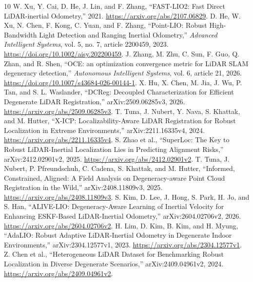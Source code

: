 \documentclass[conference]{IEEEtran}
\begin{document}
\begin{thebibliography}{10}
 W. Xu, Y. Cai, D. He, J. Lin, and F. Zhang,
``FAST-LIO2: Fast Direct LiDAR-inertial Odometry,'' 2021.
\url{https://arxiv.org/abs/2107.06829}.
 D. He, W. Xu, N. Chen, F. Kong, C. Yuan, and F. Zhang,
``Point-LIO: Robust High-Bandwidth Light Detection and Ranging Inertial
Odometry,'' \emph{Advanced Intelligent Systems}, vol. 5, no. 7,
article 2200459, 2023. \url{https://doi.org/10.1002/aisy.202200459}.
 J. Zhang, M. Zhu, C. Sun, F. Guo, Q. Zhan, and R. Shen,
``OCE: an optimization convergence metric for LiDAR SLAM degeneracy
detection,'' \emph{Autonomous Intelligent Systems}, vol. 6, article 21,
2026. \url{https://doi.org/10.1007/s43684-026-00144-1}.
 X. Hu, X. Chen, M. Jia, J. Wu, P. Tan, and S. L. Waslander,
``DCReg: Decoupled Characterization for Efficient Degenerate LiDAR
Registration,'' arXiv:2509.06285v3, 2026.
\url{https://arxiv.org/abs/2509.06285v3}.
 T. Tuna, J. Nubert, Y. Nava, S. Khattak, and M. Hutter,
``X-ICP: Localizability-Aware LiDAR Registration for Robust Localization in
Extreme Environments,'' arXiv:2211.16335v4, 2024.
\url{https://arxiv.org/abs/2211.16335v4}.
 S. Zhao et al., ``SuperLoc: The Key to Robust
LiDAR-Inertial Localization Lies in Predicting Alignment Risks,''
arXiv:2412.02901v2, 2025. \url{https://arxiv.org/abs/2412.02901v2}.
 T. Tuna, J. Nubert, P. Pfreundschuh, C. Cadena,
S. Khattak, and M. Hutter, ``Informed, Constrained, Aligned: A Field
Analysis on Degeneracy-aware Point Cloud Registration in the Wild,''
arXiv:2408.11809v3, 2025. \url{https://arxiv.org/abs/2408.11809v3}.
 S. Kim, D. Lee, J. Hong, S. Park, H. Jo, and S. Han,
``ALIVE-LIO: Degeneracy-Aware Learning of Inertial Velocity for Enhancing
ESKF-Based LiDAR-Inertial Odometry,'' arXiv:2604.02706v2, 2026.
\url{https://arxiv.org/abs/2604.02706v2}.
 H. Lim, D. Kim, B. Kim, and H. Myung,
``AdaLIO: Robust Adaptive LiDAR-Inertial Odometry in Degenerate Indoor
Environments,'' arXiv:2304.12577v1, 2023.
\url{https://arxiv.org/abs/2304.12577v1}.
 Z. Chen et al., ``Heterogeneous LiDAR Dataset for
Benchmarking Robust Localization in Diverse Degenerate Scenarios,''
arXiv:2409.04961v2, 2024. \url{https://arxiv.org/abs/2409.04961v2}.
\end{thebibliography}
\end{document}
